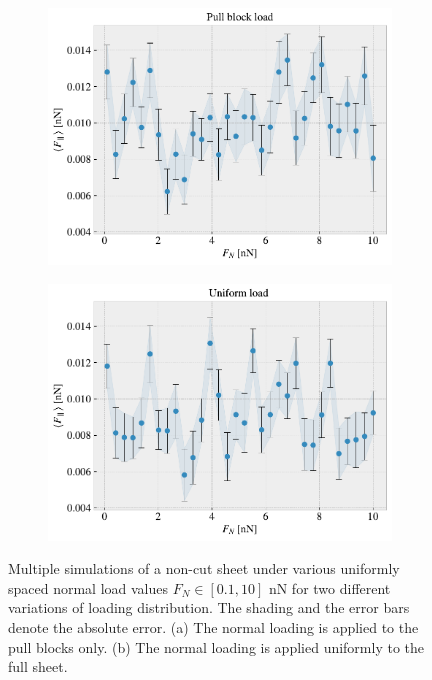 \begin{figure}[!htb]
  \centering
  \begin{subfigure}[t]{0.49\textwidth}
      \centering
      \includegraphics[width=\textwidth]{figures/baseline/load_dist_a.pdf}
      \caption{}
      \label{fig:load_dist_a}
  \end{subfigure}
  \hfill
  \begin{subfigure}[t]{0.49\textwidth}
      \centering
      \includegraphics[width=\textwidth]{figures/baseline/load_dist_b.pdf}
      \caption{}
      \label{fig:load_dist_b}
  \end{subfigure}
  \hfill
     \caption{Multiple simulations of a non-cut sheet under various uniformly spaced normal load values $F_N \in [0.1, 10]$ nN for two different variations of loading distribution. The shading and the error bars denote the absolute error. (a) The normal loading is applied to the pull blocks only. (b) The normal loading is applied uniformly to the full sheet. }
     \label{fig:load_dist}
\end{figure}

